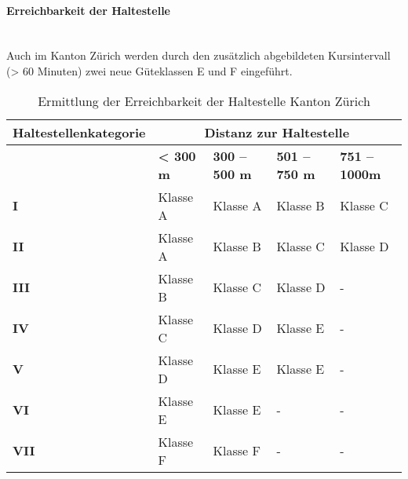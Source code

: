 \paragraph{Erreichbarkeit der Haltestelle}~\\
\label{Berechnungsmethodik Kanton Zürich:Erreichbarkeit der Haltestelle}
Auch im Kanton Zürich werden durch den zusätzlich abgebildeten Kursintervall (> 60 Minuten) zwei neue Güteklassen E und F eingeführt.

\begin{table}[ht]
    \begin{tabular}[c]{l p{2.5cm} p{2.5cm} p{2.5cm} p{2.5cm}}
        \toprule
        \textbf{Haltestellenkategorie}
                                & \multicolumn{4}{c}{\textbf{Distanz zur Haltestelle}}\\
        \midrule
        \textbf{}
                                & \textbf{< 300 m}
                                & \textbf{300 -- 500 m}
                                & \textbf{501 -- 750 m}
                                & \textbf{751 -- 1000m}\\
        \textbf{I}
                                & Klasse A
                                & Klasse A
                                & Klasse B
                                & Klasse C\\
        \textbf{II}
                                & Klasse A
                                & Klasse B
                                & Klasse C
                                & Klasse D\\
        \textbf{III}
                                & Klasse B
                                & Klasse C
                                & Klasse D
                                & -\\
        \textbf{IV}
                                & Klasse C
                                & Klasse D
                                & \cellcolor{red!25}Klasse E
                                & -\\
        \textbf{V}
                                & Klasse D
                                & \cellcolor{red!25}Klasse E
                                & \cellcolor{red!25}Klasse E
                                & -\\
        \cellcolor{red!25}\textbf{VI}
                                & \cellcolor{red!25}Klasse E
                                & \cellcolor{red!25}Klasse E
                                & -
                                & -\\
        \cellcolor{red!25}\textbf{VII}
                                & \cellcolor{red!25}Klasse F
                                & \cellcolor{red!25}Klasse F
                                & -
                                & -\\                                
        \bottomrule
    \end{tabular}
    \caption{Ermittlung der Erreichbarkeit der Haltestelle Kanton Zürich}
    \label{table:Ermittlung Erreichbarkeit der Haltestelle Kanton Zürich}
\end{table}

